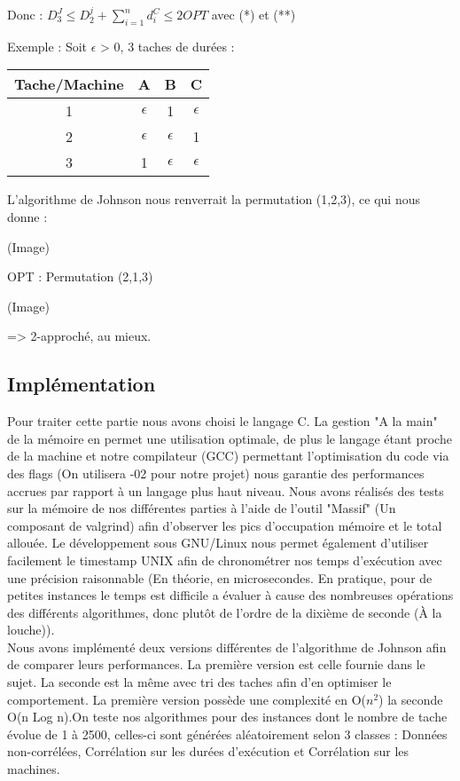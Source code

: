 \documentclass[12pt]{article}
\begin{document}
Donc :
$D_3^J \le D_2^j + \displaystyle\sum_{i=1}^n d_i^C \le 2OPT$ avec (*) et (**)

Exemple : Soit $\epsilon$ > 0, 3 taches de durées :\\

\begin{tabular}{|c|c|c|c|}
\hline 
Tache/Machine & A & B & C \\ 
\hline 
1 & $\epsilon$ & 1 & $\epsilon$ \\ 
\hline 
2 & $\epsilon$ & $\epsilon$ & 1 \\ 
\hline 
3 & 1 & $\epsilon$ & $\epsilon$ \\ 
\hline 
\end{tabular} 

L'algorithme de Johnson nous renverrait la permutation (1,2,3), ce qui nous donne :

(Image)

OPT : Permutation (2,1,3)

(Image)

=> 2-approché, au mieux.

\subsection{Implémentation}

Pour traiter cette partie nous avons choisi le langage C. La gestion "A la main" de la mémoire en permet une utilisation optimale, de plus le langage étant proche de la machine et notre compilateur (GCC) permettant l'optimisation du code via des flags (On utilisera -02 pour notre projet) nous garantie des performances accrues par rapport à un langage plus haut niveau. Nous avons réalisés des tests sur la mémoire de nos différentes parties à l'aide de l'outil "Massif" (Un composant de valgrind) afin d'observer les pics d'occupation mémoire et le total allouée. Le développement sous GNU/Linux nous permet également d'utiliser facilement le timestamp UNIX afin de chronométrer nos temps d'exécution avec une précision raisonnable (En théorie, en microsecondes. En pratique, pour de petites instances le temps est difficile a évaluer à cause des nombreuses opérations des différents algorithmes, donc plutôt de l'ordre de la dixième de seconde (À la louche)).\\

Nous avons implémenté deux versions différentes de l'algorithme de Johnson afin de comparer leurs performances. La première version est celle fournie dans le sujet. La seconde est la même avec tri des taches afin d'en optimiser le comportement. La première version possède une complexité en O($n^2$) la seconde O(n Log n).On teste nos algorithmes pour des instances dont le nombre de tache évolue de 1 à 2500, celles-ci sont générées aléatoirement selon 3 classes : Données non-corrélées, Corrélation sur les durées d'exécution et Corrélation sur les machines.\\
\end{document}
